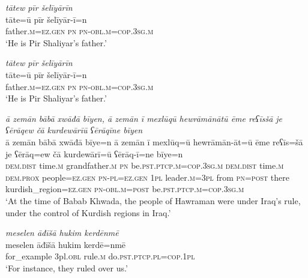 \ea \label{BP.7}
\textit{tātew pīr šelīyārīn} \\ 
\gll tāte=ū pīr šelīyār-ī=n \\ 
 father\textsc{.m}\textsc{=ez.gen} \textsc{pn} \textsc{pn}\textsc{-obl}\textsc{.m}\textsc{=cop}\textsc{.3sg}\textsc{.m} \\ 
\glt `He is Pir Shaliyar’s father.'
\z 
 
\ea \label{BP.8}
\textit{tātew pīr šelīyārīn} \\ 
\gll tāte=ū pīr šelīyār-ī=n \\ 
 father\textsc{.m}\textsc{=ez.gen} \textsc{pn} \textsc{pn}\textsc{-obl}\textsc{.m}\textsc{=cop}\textsc{.3sg}\textsc{.m} \\ 
\glt `He is Pir Shaliyar’s father.'
\z 
 
\ea \label{BP.9}
\textit{ā zemān bābā xwāđā bīyen, ā zemān ī mexlūqū hewrāmānātū ēme reʕīsšā je ʕērāqew čā kurdewārīū ʕērāqīne bīyen} \\ 
\gll ā zemān bābā xwāđā bīye=n ā zemān ī mexlūq=ū hewrāmān-āt=ū ēme reʕīs=šā je ʕērāq=ew čā kurdewārī=ū ʕērāq-ī=ne bīye=n \\ 
 \textsc{dem.dist} time\textsc{.m} grandfather\textsc{.m} \textsc{pn} be\textsc{.pst}\textsc{.ptcp}\textsc{.m}\textsc{=cop}\textsc{.3sg}\textsc{.m} \textsc{dem.dist} time\textsc{.m} \textsc{dem.prox} people\textsc{=ez.gen} \textsc{pn}\textsc{\textsc{-pl}}\textsc{=ez.gen} \textsc{1pl} leader\textsc{.m}\textsc{=3pl} from \textsc{pn}\textsc{=\textsc{post}} there kurdish\_region\textsc{=ez.gen} \textsc{pn}\textsc{-obl}\textsc{.m}\textsc{=\textsc{post}} be\textsc{.pst}\textsc{.ptcp}\textsc{.m}\textsc{=cop}\textsc{.3sg}\textsc{.m} \\ 
\glt `At the time of Babab Khwada, the people of Hawraman were under Iraq’s rule, under the control of Kurdish regions in Iraq.'
\z 
 
\ea \label{BP.10}
\textit{meselen āđīšā hukim kerdēnmē} \\ 
\gll meselen āđīšā hukim kerdē=nmē \\ 
 for\_example 3pl\textsc{.obl} rule\textsc{.m} do\textsc{.pst}\textsc{.ptcp}\textsc{.pl}\textsc{=cop}\textsc{.\textsc{1pl}} \\ 
\glt `For instance, they ruled over us.'
\z 
 
